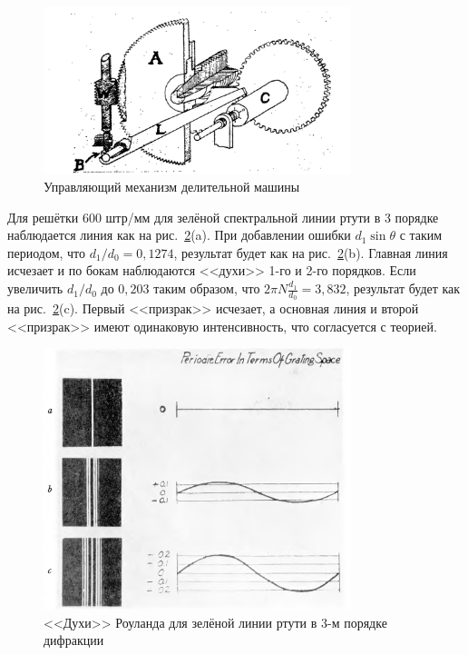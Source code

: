\documentclass[a4paper, 12pt]{article}
\begin{document}
\begin{figure}[h!]
\begin{center}
    \includegraphics[width=0.8\textwidth]{engine.png}
\end{center}
\caption{Управляющий механизм делительной машины}
\label{fig:engine}
\end{figure}

Для решётки 600 штр/мм для зелёной спектральной линии ртути в 3 порядке наблюдается линия как на рис.~\ref{fig:mercury}(a). При добавлении ошибки $d_1 \sin{\theta}$ с таким периодом, что $d_1 / d_0 = 0,1274$, результат будет как на рис.~\ref{fig:mercury}(b). Главная линия исчезает и по бокам наблюдаются <<духи>> 1-го и 2-го порядков. Если увеличить $d_1 / d_0$ до $0,203$ таким образом, что $2 \pi N \frac{d_1}{d_0} = 3,832$, результат будет как на рис.~\ref{fig:mercury}(c). Первый <<призрак>> исчезает, а основная линия и второй <<призрак>> имеют одинаковую интенсивность, что согласуется с теорией.

\begin{figure}[h!]
\begin{center}
    \includegraphics[width=0.8\textwidth]{mercury.png}
\end{center}
\caption{<<Духи>> Роуланда для зелёной линии ртути в 3-м порядке дифракции}
\label{fig:mercury}
\end{figure}
\end{document}
